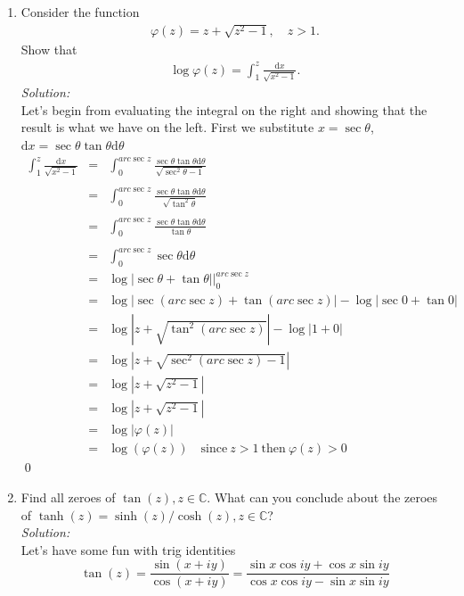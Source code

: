 \documentclass[10pt]{amsart}
\newcommand{\D}{\mathrm{d}}
\theoremstyle{nonumberplain}
\begin{document}
\begin{enumerate}[label={\bf {\arabic*}:}]
\item Consider the function
    \begin{align*}
      \varphi(z) = z + \sqrt{z^2 - 1}, \quad z > 1.
    \end{align*}
    Show that
    \begin{align*}
      \log \varphi(z) = \int_1^z \frac{\D x}{\sqrt{x^2 - 1}}.
    \end{align*}
\textit{Solution:} \\
Let's begin from evaluating the integral on the right and showing that the result is what we have on the left. First we substitute $x = \sec\theta$, $\D x = \sec\theta\tan\theta \D \theta$
\begin{eqnarray*}
\int_1^z \frac{\D x}{\sqrt{x^2 - 1}} &=& \int_0^{arc\sec z} \frac{\sec\theta\tan\theta \D \theta}{\sqrt{{\sec^2\theta} - 1}} \\ \\
&=& \int_0^{arc\sec z} \frac{ \sec \theta \tan \theta \D \theta}{\sqrt{\tan^2 \theta}} \\ \\
&=& \int_0^{arc\sec z} \frac{ \sec \theta \tan \theta \D \theta}{\tan \theta} \\ \\
&=& \int_0^{arc\sec z} \sec \theta \D \theta \\
&=& \left. \log\left| \sec \theta + \tan\theta \right| \right|_{0}^{arc\sec z} \\
&=& \log\left| \sec (arc\sec z) + \tan(arc\sec z)\right| - \log\left| \sec 0 + \tan 0 \right| \\
&=& \log\left| z + \sqrt{\tan^2(arc\sec z)}\right| - \log\left| 1 + 0 \right| \\
&=& \log\left| z + \sqrt{\sec^2(arc\sec z) - 1}\right| \\
&=& \log\left| z + \sqrt{z^2 - 1} \right| \\
&=& \log\left| z + \sqrt{z^2 - 1} \right| \\
&=& \log\left|\varphi(z)\right| \\
&=& \log(\varphi(z)) \quad \text{since} \: z > 1 \: \text{then} \: \varphi(z) > 0 
\end{eqnarray*}
\qed
\item Find all zeroes of $\tan (z), z \in \mathbb{C}$. What can you
  conclude about the zeroes of $\tanh (z)=\sinh (z) / \cosh (z), z \in
  \mathbb C$?\\
\textit{Solution:} \\
Let's have some fun with trig identities 
$$\tan(z) = \frac{\sin(x + iy)}{\cos(x + iy)} = \frac{\sin x\cos iy + \cos x \sin iy }{\cos x \cos iy  - \sin x \sin iy}$$

\end{enumerate}
\end{document}
